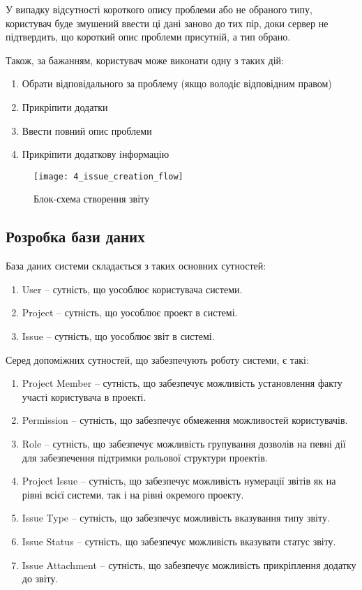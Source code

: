 \documentclass[../main.tex]{subfiles}
\begin{document}
У випадку відсутності короткого опису проблеми або не обраного типу, користувач буде змушений ввести ці дані заново до тих пір, доки сервер не підтвердить, що короткий опис проблеми присутній, а тип обрано.

Також, за бажанням, користувач може виконати одну з таких дій:
\begin{enumerate}
	\item Обрати відповідального за проблему (якщо володіє відповідним правом)
	\item Прикріпити додатки
	\item Ввести повний опис проблеми
	\item Прикріпити додаткову інформацію
\end{enumerate}

\begin{figure}[H]
	\centering
	\texttt{[image: 4\_issue\_creation\_flow]}
	\caption{Блок-схема створення звіту}
\end{figure}

\subsection{Розробка бази даних}

База даних системи складається з таких основних сутностей:
\begin{enumerate}
	\item User -- сутність, що уособлює користувача системи.
	\item Project -- сутність, що уособлює проект в системі.
	\item Issue -- сутність, що уособлює звіт в системі.
\end{enumerate}

Серед допоміжних сутностей, що забезпечують роботу системи, є такі:
\begin{enumerate}
	\item Project Member -- сутність, що забезпечує можливість установлення факту участі користувача в проекті.
	\item Permission -- сутність, що забезпечує обмеження можливостей користувачів.
	\item Role -- сутність, що забезпечує можливість групування дозволів на певні дії для забезпечення підтримки рольової структури проектів.
	\item Project Issue -- сутність, що забезпечує можливість нумерації звітів як на рівні всієї системи, так і на рівні окремого проекту.
	\item Issue Type -- сутність, що забезпечує можливість вказування типу звіту.
	\item Issue Status -- сутність, що забезпечує можливість вказувати статус звіту.
	\item Issue Attachment -- сутність, що забезпечує можливість прикріплення додатку до звіту.
\end{enumerate}
\end{document}
